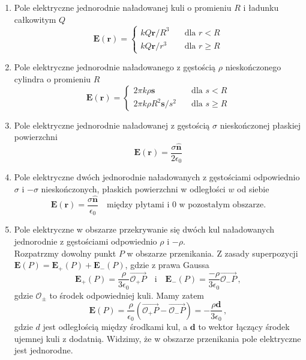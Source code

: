 \documentclass[../main.tex]{subfiles}
\begin{document}
\begin{enumerate}
    \item Pole elektryczne jednorodnie naładowanej kuli o promieniu \(R\) i ładunku całkowitym \(Q\)
    \begin{equation*}
        \mathbf{E}(\mathbf{r})=\begin{cases} kQ\mathbf{r}/R^3\quad&\text{dla \(r<R\)}\\ kQ\mathbf{r}/r^3\quad&\text{dla \(r\geq R\)}\end{cases}
    \end{equation*}
    \item Pole elektryczne jednorodnie naładowanego z gęstością \(\rho\) nieskończonego cylindra o promieniu \(R\)
    \begin{equation*}
        \mathbf{E}(\mathbf{r})= \begin{cases} 
        2\pi k \rho\mathbf{s}\quad&\text{dla \(s<R\)}\\
        2\pi k\rho R^2\mathbf{s}/s^2\quad&\text{dla \(s\geq R\)}
        \end{cases}
    \end{equation*}
    \item Pole elektryczne jednorodnie naładowanej z gęstością \(\sigma\) nieskończonej płaskiej powierzchni
    \begin{equation*}
        \mathbf{E}(\mathbf{r})=\frac{\sigma \mathbf{\hat{n}}}{2\epsilon_0}
    \end{equation*}
    \item Pole elektryczne dwóch jednorodnie naładowanych z gęstościami odpowiednio \(\sigma\) i \(-\sigma\) nieskończonych, płaskich powierzchni w odległości \(w\) od siebie
    \begin{equation*}
        \mathbf{E}(\mathbf{r})=\frac{\sigma \mathbf{\hat{n}}}{\epsilon_0}\quad\text{między płytami i 0 w pozostałym obszarze.}
    \end{equation*}
    
    \item Pole elektryczne w obszarze przekrywanie się dwóch kul naładowanych jednorodnie z gęstościami odpowiednio \(\rho\) i \(-\rho\).\\
    Rozpatrzmy dowolny punkt \(P\) w obszarze przenikania. Z zasady superpozycji \(\mathbf{E}(P)=\mathbf{E}_+(P)+\mathbf{E}_-(P)\), gdzie z prawa Gaussa
    \begin{equation*}
        \mathbf{E}_+(P)=\frac{\rho}{3\epsilon_0}\overrightarrow{\mathcal{O}_+P}\quad\text{i}\quad\mathbf{E}_-(P)=\frac{-\rho}{3\epsilon_0}\overrightarrow{\mathcal{O}_-P}\,,
    \end{equation*}
    gdzie \(\mathcal{O}_\pm\) to środek odpowiedniej kuli. Mamy zatem
    \begin{equation*}
        \mathbf{E}(P)=\frac{\rho}{\epsilon_0}(\overrightarrow{\mathcal{O}_+P}-\overrightarrow{\mathcal{O}_-P})=-\frac{\rho\mathbf{d}}{3\epsilon_0}\,,
    \end{equation*}
    gdzie \(d\) jest odległością między środkami kul, a \(\mathbf{d}\) to wektor łączący środek ujemnej kuli z dodatnią. Widzimy, że w obszarze przenikania pole elektryczne jest jednorodne.
\end{enumerate}
\end{document}
